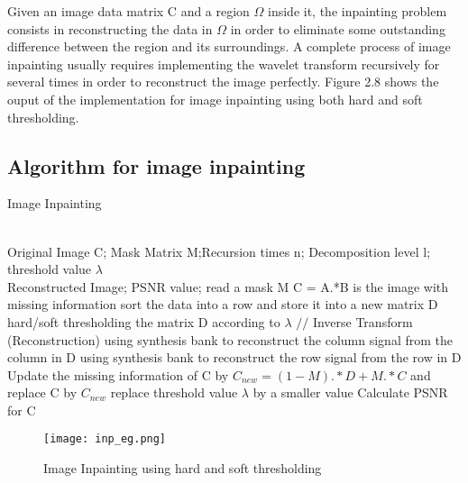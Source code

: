 Given an image data matrix C and a region $\Omega$ inside it, the inpainting problem consists in reconstructing the data in $\Omega$ in order to eliminate some outstanding difference between the region and its surroundings. A complete process of image inpainting usually requires implementing the wavelet transform recursively for several times in order to reconstruct the image perfectly. Figure 2.8 shows the ouput of the implementation for image inpainting using both hard and soft thresholding.

\subsection{Algorithm for image inpainting}

\renewcommand{\algorithmicrequire}{ \textbf{Input:}} %
\renewcommand{\algorithmicensure}{ \textbf{Output:}} %

\begin{algorithm}  
\caption{Image Inpainting}  
\label{alg:3}  
\begin{algorithmic}
\REQUIRE ~~\\ %
Original Image C; Mask Matrix M;Recursion times n; Decomposition level l; threshold value $\lambda$
\ENSURE ~~\\ %
Reconstructed Image; PSNR value;
\STATE read a mask M
\STATE C = A.*B is the image with missing information
\STATE sort the data into a row and store it into a new matrix D
\ENDFOR
{}
\ENDFOR
\STATE hard/soft thresholding the matrix D according to $\lambda$
\STATE $//$ Inverse Transform (Reconstruction)
\STATE using synthesis bank to reconstruct the column signal from the column in D
\ENDFOR
{}
\STATE using synthesis bank to reconstruct the row signal from the row in D
\ENDFOR
\STATE Update the missing information of C by $C_{new}=(1-M).*D+M.*C$ and replace C by $C_{new}$
\STATE replace threshold value $\lambda$ by a smaller value
\ENDFOR
\STATE Calculate PSNR for C
\end{algorithmic}  
\end{algorithm}  

\begin{figure}[h]
\centering
\texttt{[image: inp\_eg.png]}
\caption{Image Inpainting using hard and soft thresholding }
\end{figure}

